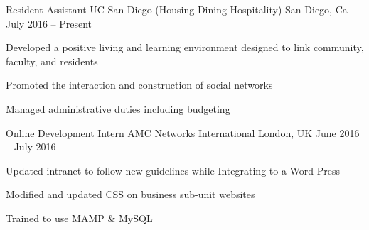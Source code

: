 \documentclass[]{awesome-cv}
\begin{document}
\begin{cventries}
	\cventry
	{Resident Assistant}
	{UC San Diego (Housing Dining Hospitality)}
	{San Diego, Ca}
	{July 2016 – Present}
	{\begin{cvitems}
		\item {Developed a positive living and learning environment designed to link community, faculty, and residents}
		\item {Promoted the interaction and construction of social networks}
		\item {Managed administrative duties including budgeting}
	\end{cvitems}}
	
	\cventry
	{Online Development Intern}
	{AMC Networks International}
	{London, UK}
	{June 2016 – July 2016}
	{\begin{cvitems}
		\item {Updated intranet to follow new guidelines while Integrating to a Word Press}
		\item {Modified and updated CSS on business sub-unit websites}
		\item {Trained to use MAMP \& MySQL}
		\end{cvitems}}
\end{cventries}
\end{document}
